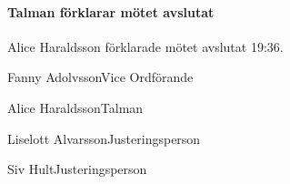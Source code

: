\documentclass{dsekminutes}
\begin{document}
\paragraph{Talman förklarar mötet avslutat}
Alice Haraldsson förklarade mötet avslutat 19:36.

\vspace{5cm}

\endParagraphed

\signature{Vid protokollet}{Fanny Adolvsson}{Vice Ordförande}
\signature{Mötesordförande}{Alice Haraldsson}{Talman}
\signature{Justeras}{Liselott Alvarsson}{Justeringsperson}
\signature{Justeras}{Siv Hult}{Justeringsperson}
\end{document}
